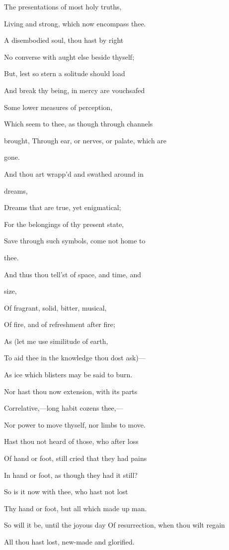 The presentations of most holy truths,

Living and strong, which now encompass thee.

A disembodied soul, thou hast by right

No converse with aught else beside thyself;

But, lest so stern a solitude should load

And break thy being, in mercy are vouchsafed

Some lower measures of perception,

Which seem to thee, as though through channels

brought, Through ear, or nerves, or palate, which are

gone.

And thou art wrapp'd and swathed around in

dreams,

Dreams that are true, yet enigmatical;

For the belongings of thy present state,

Save through such symbols, come not home to

thee.

And thus thou tell'st of space, and time, and

size,

Of fragrant, solid, bitter, musical,

Of fire, and of refreshment after fire;

As (let me use similitude of earth,

To aid thee in the knowledge thou dost ask)—

As ice which blisters may be said to burn.

Nor hast thou now extension, with its parts

Correlative,—long habit cozens thee,—

Nor power to move thyself, nor limbs to move.

Hast thou not heard of those, who after loss

Of hand or foot, still cried that they had pains

In hand or foot, as though they had it still?

So is it now with thee, who hast not lost

Thy hand or foot, but all which made up man.

So will it be, until the joyous day Of resurrection, when thou wilt regain

All thou hast lost, new-made and glorified.

